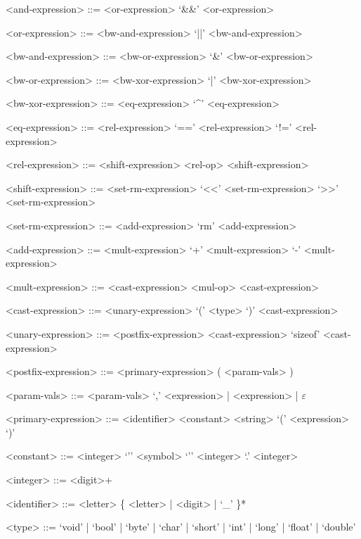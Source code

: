 \documentclass[
	article,			%
	11pt,				%
	oneside,			%
	a4paper,			%
	english,			%
	brazil,				%
	sumario=tradicional
	]{abntex2}
\begin{document}
\begin{grammar}
	<and-expression> ::= <or-expression>
	\alt <and-expression> `&&' <or-expression>
	
	<or-expression> ::= <bw-and-expression>
	\alt <or-expression> `||' <bw-and-expression>
	
	<bw-and-expression> ::= <bw-or-expression>
	\alt <bw-and-expression> `&' <bw-or-expression>
	
	<bw-or-expression> ::= <bw-xor-expression>
	\alt <bw-or-expression> `|' <bw-xor-expression>
	
	<bw-xor-expression> ::= <eq-expression>
	\alt <bw-xor-expression> `^' <eq-expression>
	
	<eq-expression> ::= <rel-expression>
	\alt <eq-expression> `==' <rel-expression>
	\alt <eq-expression> `!=' <rel-expression>
	
	<rel-expression> ::= <shift-expression>
	\alt <rel-expression> <rel-op> <shift-expression>
	
	<shift-expression> ::= <set-rm-expression>
	\alt <shift-expression> `<<' <set-rm-expression>
	\alt <shift-expression> `>>' <set-rm-expression>

	<set-rm-expression> ::= <add-expression>
	\alt <set-rm-expression> `rm' <add-expression>
	
	<add-expression> ::= <mult-expression>
	\alt <add-expression> `+' <mult-expression>
	\alt <add-expression> `-' <mult-expression>
	
	<mult-expression> ::= <cast-expression>
	\alt <mult-expression> <mul-op> <cast-expression>
	
	<cast-expression> ::= <unary-expression>
	\alt `(' <type> `)' <cast-expression>
	
	<unary-expression> ::= <postfix-expression>
	\alt <unary-op> <cast-expression>
	\alt `sizeof' <cast-expression>
	
	<postfix-expression> ::= <primary-expression>
	\alt <postfix-expression> ( <param-vals> )
		
	<param-vals> ::= <param-vals> `,' <expression> | <expression> | $\varepsilon$
	
	<primary-expression> ::= <identifier>
	\alt <constant>
	\alt <string>
	\alt `(' <expression> `)'
	
	<constant> ::= <integer>
	\alt `'' <symbol> `''
	\alt <integer> `.' <integer>
	
	<integer> ::= <digit>+
	
	<identifier> ::= <letter> \{ <letter> | <digit> | `_' \}*

	<type> ::= `void' | `bool' | `byte' | `char' | `short' | `int' | `long' | `float' | `double'
	

\end{grammar}
\end{document}
